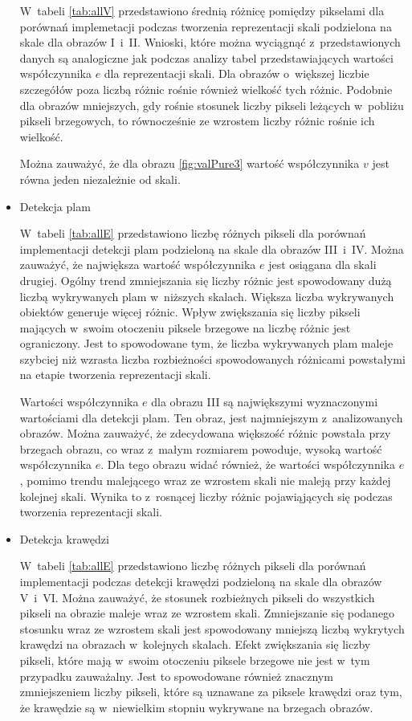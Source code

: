 \begin{itemize}
W~tabeli \ref{tab:allV} przedstawiono średnią różnicę pomiędzy pikselami dla porównań implemetacji podczas tworzenia reprezentacji skali podzielona na skale dla obrazów I~i~II. Wnioski, które można wyciągnąć z~przedstawionych danych są analogiczne jak podczas analizy tabel przedstawiających wartości współczynnika $ e $ dla reprezentacji skali. Dla obrazów o~większej liczbie szczegółów poza liczbą różnic rośnie również wielkość tych różnic. Podobnie dla obrazów mniejszych, gdy rośnie stosunek liczby pikseli leżących w~pobliżu pikseli brzegowych, to równocześnie ze wzrostem liczby różnic rośnie ich wielkość.

Można zauważyć, że dla obrazu \ref{fig:valPure3} wartość współczynnika $ v $ jest równa jeden niezależnie od skali.

\item{Detekcja plam}
\label{subsubsec:plamyTabele}

\nopagebreak
W~tabeli \ref{tab:allE} przedstawiono liczbę różnych pikseli dla porównań implementacji detekcji plam podzieloną na skale dla obrazów III~i~IV. Można zauważyć, że największa wartość współczynnika $ e $ jest osiągana dla skali drugiej. Ogólny trend zmniejszania się liczby różnic jest spowodowany dużą liczbą wykrywanych plam w~niższych skalach. Większa liczba wykrywanych obiektów generuje więcej różnic. Wpływ zwiększania się liczby pikseli mających w~swoim otoczeniu piksele brzegowe na liczbę różnic jest ograniczony. Jest to spowodowane tym, że liczba wykrywanych plam maleje szybciej niż wzrasta liczba rozbieżności spowodowanych różnicami powstałymi na etapie tworzenia reprezentacji skali.

Wartości współczynnika $ e $ dla obrazu III są największymi wyznaczonymi wartościami dla detekcji plam. Ten obraz, jest najmniejszym z~analizowanych obrazów. Można zauważyć, że zdecydowana większość różnic powstała przy brzegach obrazu, co wraz z~małym rozmiarem powoduje, wysoką wartość współczynnika $ e $. Dla tego obrazu widać również, że wartości współczynnika $ e $, pomimo trendu malejącego wraz ze wzrostem skali nie maleją przy każdej kolejnej skali. Wynika to z~rosnącej liczby różnic pojawiąjących się podczas tworzenia reprezentacji skali.


\item{Detekcja krawędzi}
\label{subsubsec:krawedzieTabele}

\nopagebreak
W~tabeli \ref{tab:allE} przedstawiono liczbę różnych pikseli dla porównań implementacji podczas detekcji krawędzi podzieloną na skale dla obrazów V~i~VI. Można zauważyć, że stosunek rozbieżnych pikseli do wszystkich pikseli na obrazie maleje wraz ze wzrostem skali. Zmniejszanie się podanego stosunku wraz ze wzrostem skali jest spowodowany mniejszą liczbą wykrytych krawędzi na obrazach w~kolejnych skalach. Efekt zwiększania się liczby pikseli, które mają w~swoim otoczeniu piksele brzegowe nie jest w~tym przypadku zauważalny. Jest to spowodowane również znacznym zmniejszeniem liczby pikseli, które są uznawane za piksele krawędzi oraz tym, że krawędzie są w~niewielkim stopniu wykrywane na brzegach obrazów.


\end{itemize}
